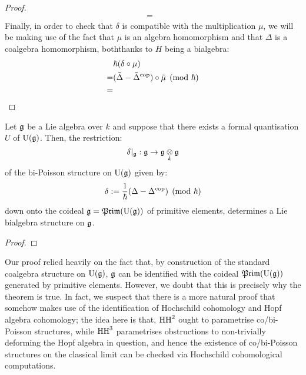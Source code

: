 \begin{proof}
$$\begin{aligned}
                            = & 
                        \end{aligned}
                    $$
                Finally, in order to check that $\delta$ is compatible with the multiplication $\mu$, we will be making use of the fact that $\mu$ is an algebra homomorphism and that $\Delta$ is a coalgebra homomorphism, boththanks to $H$ being a bialgebra:
                    $$
                        \begin{aligned}
                            & \hbar( \delta \circ \mu )
                            \\
                            = & (\tilde{\Delta} - \tilde{\Delta}^{\mathrm{cop}}) \circ \tilde{\mu} \pmod{\hbar}
                            \\
                            = & 
                        \end{aligned}
                    $$
            \end{proof}
        \begin{theorem} \label{theorem: lie_bialgebra_structures_from_bi_poisson_structures}
            Let $\mathfrak{g}$ be a Lie algebra over $k$ and suppose that there exists a formal quantisation $U$ of $\mathrm{U}(\mathfrak{g})$. Then, the restriction:
                $$\delta|_{\g}: \g \to \g \tensor_k \g$$
            of the bi-Poisson structure on $\mathrm{U}(\mathfrak{g})$ given by:
                $$\delta := \frac{1}{\hbar}(\Delta - \Delta^{\mathrm{cop}}) \pmod{\hbar}$$
            down onto the coideal $\mathfrak{g} = \mathfrak{Prim}(\mathrm{U}(\mathfrak{g}))$ of primitive elements, determines a Lie bialgebra structure on $\mathfrak{g}$.    
        \end{theorem}
            \begin{proof}
                
            \end{proof}
        \begin{remark}
            Our proof relied heavily on the fact that, by construction of the standard coalgebra structure on $\mathrm{U}(\mathfrak{g})$, $\mathfrak{g}$ can be identified with the coideal $\mathfrak{Prim}(\mathrm{U}(\mathfrak{g}))$ generated by primitive elements. However, we doubt that this is precisely why the theorem is true. In fact, we suspect that there is a more natural proof that somehow makes use of the identification of Hochschild cohomology and Hopf algebra cohomology; the idea here is that, $\mathrm{HH}^2$ ought to parametrise co/bi-Poisson structures, while $\mathrm{HH}^3$ parametrises obstructions to non-trivially deforming the Hopf algebra in question, and hence the existence of co/bi-Poisson structures on the classical limit can be checked via Hochschild cohomological computations. 
        \end{remark}
    
